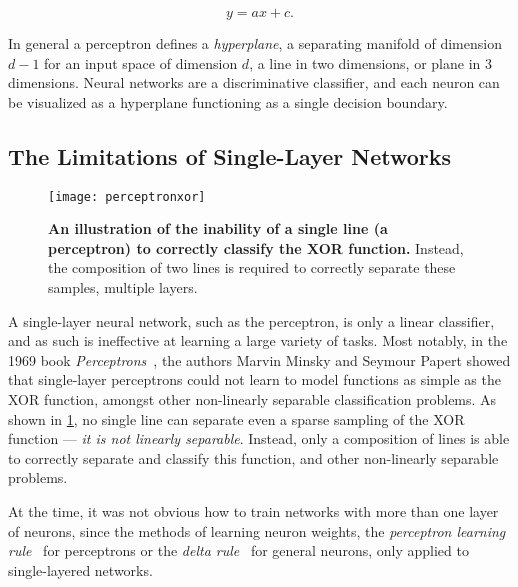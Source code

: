\documentclass[thesis]{subfiles}
\begin{document}
\begin{equation}
y = a x + c.
\end{equation}

In general a perceptron defines a \emph{hyperplane}, a separating manifold of dimension $d - 1$ for an input space of dimension $d$, a line in two dimensions, or plane in 3 dimensions. Neural networks are a discriminative classifier, and each neuron can be visualized as a hyperplane functioning as a single decision boundary.

\subsection{The Limitations of Single-Layer Networks}\label{singlelayernetworks}
\begin{figure}[tbp]
\centering
\texttt{[image: perceptronxor]}
\caption[An illustration of the inability of a single line to correctly classify the XOR function.]{\textbf{An illustration of the inability of a single line (\ie{}a perceptron) to correctly classify the XOR function.} Instead, the composition of two lines is required to correctly separate these samples, \ie{}multiple layers.}
\label{fig:perceptronxor}
\end{figure}
A single-layer neural network, such as the perceptron, is only a linear classifier, and as such is ineffective at learning a large variety of tasks. Most notably, in the 1969 book \emph{Perceptrons}~\citep{minsky1988perceptrons}, the authors Marvin Minsky and Seymour Papert showed that single-layer perceptrons could not learn to model functions as simple as the XOR function, amongst other non-linearly separable classification problems. As shown in \cref{fig:perceptronxor}, no single line can separate even a sparse sampling of the XOR function --- \ie\emph{it is not linearly separable}. Instead, only a composition of lines is able to correctly separate and classify this function, and other non-linearly separable problems.

At the time, it was not obvious how to train networks with more than one layer of neurons, since the methods of learning neuron weights, the \emph{perceptron learning rule}~\citep{rosenblatt1961principles} for perceptrons or the \emph{delta rule}~\citep{widrow1960adaptive} for general neurons, only applied to single-layered networks. %
\end{document}
